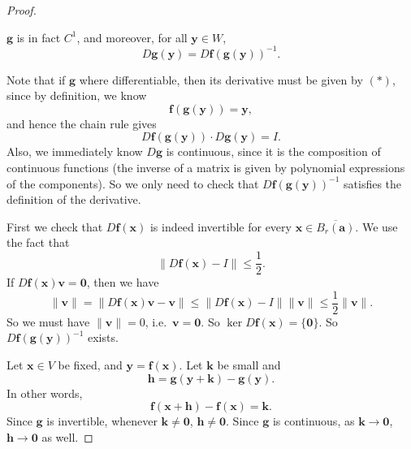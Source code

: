 \documentclass[a4paper]{article}
\begin{document}
\begin{proof}
  \begin{claim}
    $\mathbf{g}$ is in fact $C^1$, and moreover, for all $\mathbf{y} \in W$,
    \[
      D \mathbf{g}(\mathbf{y}) = D \mathbf{f}(\mathbf{g}(\mathbf{y}))^{-1}.\tag{$*$}
    \]
  \end{claim}
  Note that if $\mathbf{g}$ where differentiable, then its derivative must be given by $(*)$, since by definition, we know
  \[
    \mathbf{f}(\mathbf{g}(\mathbf{y})) = \mathbf{y},
  \]
  and hence the chain rule gives
  \[
    D \mathbf{f}(\mathbf{g}(\mathbf{y})) \cdot D \mathbf{g}(\mathbf{y}) = I.
  \]
  Also, we immediately know $D \mathbf{g}$ is continuous, since it is the composition of continuous functions (the inverse of a matrix is given by polynomial expressions of the components). So we only need to check that $D \mathbf{f}(\mathbf{g}(\mathbf{y}))^{-1}$ satisfies the definition of the derivative.

  First we check that $D\mathbf{f}(\mathbf{x})$ is indeed invertible for every $\mathbf{x} \in \overline{B_r(\mathbf{a})}$. We use the fact that
  \[
    \|D \mathbf{f}(\mathbf{x}) - I\| \leq \frac{1}{2}.
  \]
  If $D\mathbf{f}(\mathbf{x}) \mathbf{v} = \mathbf{0}$, then we have
  \[
    \|\mathbf{v}\| = \|D \mathbf{f}(\mathbf{x})\mathbf{v} - \mathbf{v}\| \leq \|D \mathbf{f}(\mathbf{x}) - I\| \|\mathbf{v}\| \leq \frac{1}{2} \|\mathbf{v}\|.
  \]
  So we must have $\|\mathbf{v}\| = 0$, i.e.\ $\mathbf{v} = \mathbf{0}$. So $\ker D \mathbf{f}(\mathbf{x}) = \{\mathbf{0}\}$. So $D \mathbf{f}(\mathbf{g}(\mathbf{y}))^{-1}$ exists.

  Let $\mathbf{x} \in V$ be fixed, and $\mathbf{y} = \mathbf{f}(\mathbf{x})$. Let $\mathbf{k}$ be small and
  \[
    \mathbf{h} = \mathbf{g}(\mathbf{y} + \mathbf{k}) - \mathbf{g}(\mathbf{y}).
  \]
  In other words,
  \[
    \mathbf{f}(\mathbf{x} + \mathbf{h}) - \mathbf{f}(\mathbf{x}) = \mathbf{k}.
  \]
  Since $\mathbf{g}$ is invertible, whenever $\mathbf{k} \not= \mathbf{0}$, $\mathbf{h} \not= \mathbf{0}$. Since $\mathbf{g}$ is continuous, as $\mathbf{k} \to \mathbf{0}$, $\mathbf{h} \to \mathbf{0}$ as well.


\end{proof}
\end{document}
